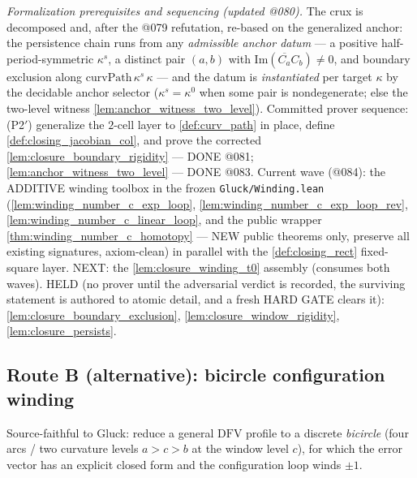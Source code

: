 \emph{Formalization prerequisites and sequencing (updated @080).} The crux is
decomposed and, after the @079 refutation, re-based on the generalized anchor:
the persistence chain runs from any \emph{admissible anchor datum} --- a
positive half-period-symmetric $\kappa^s$, a distinct pair $(a,b)$ with
$\mathrm{Im}(\overline{C_a} C_b) \ne 0$, and boundary exclusion along
$\mathrm{curvPath}\,\kappa^s\,\kappa$ --- and the datum is \emph{instantiated}
per target $\kappa$ by the decidable anchor selector ($\kappa^s = \kappa^0$
when some pair is nondegenerate; else the two-level witness
\cref{lem:anchor_witness_two_level}). Committed prover sequence: (P2$'$) generalize
the $2$-cell layer to \cref{def:curv_path} in place, define
\cref{def:closing_jacobian_col}, and prove the corrected
\cref{lem:closure_boundary_rigidity} --- DONE @081;
\cref{lem:anchor_witness_two_level} --- DONE @083. Current wave (@084): the
ADDITIVE winding toolbox in the frozen \texttt{Gluck/Winding.lean}
(\cref{lem:winding_number_c_exp_loop},
\cref{lem:winding_number_c_exp_loop_rev},
\cref{lem:winding_number_c_linear_loop}, and the public wrapper
\cref{thm:winding_number_c_homotopy} --- NEW public theorems only, preserve
all existing signatures, axiom-clean) in parallel with the
\cref{def:closing_rect} fixed-square layer. NEXT: the
\cref{lem:closure_winding_t0} assembly (consumes both waves). HELD (no prover
until the adversarial verdict is recorded, the surviving statement is authored
to atomic detail, and a fresh HARD GATE clears it):
\cref{lem:closure_boundary_exclusion}, \cref{lem:closure_window_rigidity},
\cref{lem:closure_persists}.


\subsection*{Route B (alternative): bicircle configuration winding}

Source-faithful to Gluck: reduce a general $\mathrm{DFV}$ profile to a discrete
\emph{bicircle} (four arcs / two curvature levels $a > c > b$ at the window level
$c$), for which the error vector has an explicit closed form and the
configuration loop winds $\pm 1$.

